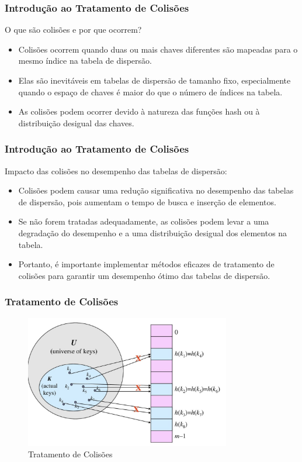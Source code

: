 
\begin{frame}[fragile]
  \frametitle{Introdução ao Tratamento de Colisões}
  O que são colisões e por que ocorrem?
      \begin{itemize}
        \item Colisões ocorrem quando duas ou mais chaves diferentes são mapeadas para o mesmo índice na tabela de dispersão.
        \item Elas são inevitáveis em tabelas de dispersão de tamanho fixo, especialmente quando o espaço de chaves é maior do que o número de índices na tabela.
        \item As colisões podem ocorrer devido à natureza das funções hash ou à distribuição desigual das chaves.
      \end{itemize}
\end{frame}

\begin{frame}[fragile]
  \frametitle{Introdução ao Tratamento de Colisões}
  Impacto das colisões no desempenho das tabelas de dispersão:
      \begin{itemize}
        \item Colisões podem causar uma redução significativa no desempenho das tabelas de dispersão, pois aumentam o tempo de busca e inserção de elementos.
        \item Se não forem tratadas adequadamente, as colisões podem levar a uma degradação do desempenho e a uma distribuição desigual dos elementos na tabela.
        \item Portanto, é importante implementar métodos eficazes de tratamento de colisões para garantir um desempenho ótimo das tabelas de dispersão.
      \end{itemize}
\end{frame}


\begin{frame}[fragile]
  \frametitle{Tratamento de Colisões}
  \begin{figure}
    \centering
    \includegraphics[width=0.8\textwidth]{aulas/aula2-hash-fig2.png}
    \caption{Tratamento de Colisões}
  \end{figure}
\end{frame}

